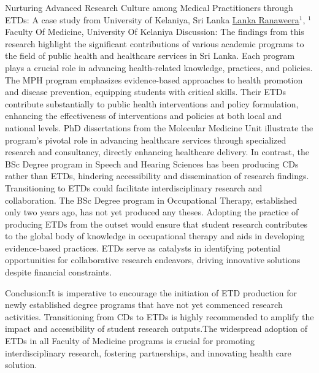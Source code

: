 \begin{abstract_online}{Nurturing Advanced Research Culture among Medical Practitioners through ETDs: A case study from University of Kelaniya, Sri Lanka}{%
        \underline{Lanka Ranaweera}$^{1}$,}{%
        }{%
        $^1$ Faculty Of Medicine, University Of Kelaniya}
   Discussion: The findings from this research highlight the significant contributions of various academic programs to the field of public health and healthcare services in Sri Lanka. Each program plays a crucial role in advancing health-related knowledge, practices, and policies. The MPH program emphasizes evidence-based approaches to health promotion and disease prevention, equipping students with critical skills. Their ETDs contribute substantially to public health interventions and policy formulation, enhancing the effectiveness of interventions and policies at both local and national levels. PhD dissertations from the Molecular Medicine Unit illustrate the program's pivotal role in advancing healthcare services through specialized research and consultancy, directly enhancing healthcare delivery. In contrast, the BSc Degree program in Speech and Hearing Sciences has been producing CDs rather than ETDs, hindering accessibility and dissemination of research findings. Transitioning to ETDs could facilitate interdisciplinary research and collaboration. The BSc Degree program in Occupational Therapy, established only two years ago, has not yet produced any theses. Adopting the practice of producing ETDs from the outset would ensure that student research contributes to the global body of knowledge in occupational therapy and aids in developing evidence-based practices. ETDs serve as catalysts in identifying potential opportunities for collaborative research endeavors, driving innovative solutions despite financial constraints.
   
   Conclusion:It is imperative to encourage the initiation of ETD production for newly established degree programs that have not yet commenced research activities. Transitioning from CDs to ETDs is highly recommended to amplify the impact and accessibility of student research outputs.The widespread adoption of ETDs in all Faculty of Medicine programs is crucial for promoting interdisciplinary research, fostering partnerships, and innovating health  care solution.
    \end{abstract_online}
    

